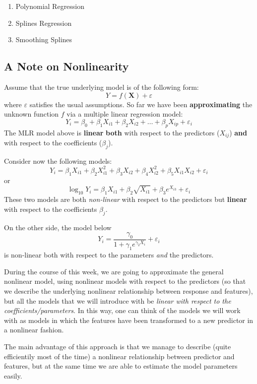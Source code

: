 \documentclass[
]{book}
\providecommand{\tightlist}{%
  \setlength{\itemsep}{0pt}\setlength{\parskip}{0pt}}
\begin{document}
\begin{enumerate}
\def\labelenumi{(\roman{enumi})}
\tightlist
\item
  Polynomial Regression
\item
  Splines Regression
\item
  Smoothing Splines
\end{enumerate}

\subsection{A Note on Nonlinearity}\label{a-note-on-nonlinearity}

Assume that the true underlying model is of the following form:
\[Y = f(\mathbf{X}) + \varepsilon\]
where \(\varepsilon\) satisfies the usual assumptions. So far we have been \textbf{approximating} the unknown function \(f\) via a multiple linear regression model:
\[Y_i = \beta_0 + \beta_1 X_{i1} +  \beta_2 X_{i2} +\ldots +  \beta_p X_{ip} +\varepsilon_i \]
The MLR model above is \textbf{linear} \textbf{both} with respect to the predictors (\(X_{ij}\)) \textbf{and} with respect to the coefficients (\(\beta_j\)).

Consider now the following models:
\[Y_i = \beta_1 X_{i1} +  \beta_2 X_{i1}^2 +\beta_3 X_{i2} + \beta_4 X_{i2}^2 +  \beta_5 X_{i1} X_{i2} +\varepsilon_i \]
or
\[\log_{10}Y_i = \beta_1 X_{i1} +  \beta_2 \sqrt{X_{i1}} +\beta_3 e^{X_{i3}} +\varepsilon_i\]
These two models are both \emph{non-linear} with respect to the predictors but \textbf{linear} with respect to the coefficients \(\beta_j\).

On the other side, the model below
\[Y_i =  \frac{\gamma_0}{1+ \gamma_1 e^{\gamma_2 X_i}} + \varepsilon_i \]
is non-linear both with respect to the parameters \emph{and} the predictors.

During the course of this week, we are going to approximate the general nonlinear model, using nonlinear models with respect to the predictors (so that we describe the underlying nonlinear relationship between response and features), but all the models that we will introduce with be \emph{linear with respect to the coefficients/parameters}. In this way, one can think of the models we will work with as models in which the features have been transformed to a new predictor in a nonlinear fashion.

The main advantage of this approach is that we manage to describe (quite efficientily most of the time) a nonlinear relationship between predictor and features, but at the same time we are able to estimate the model parameters easily.
\end{document}
